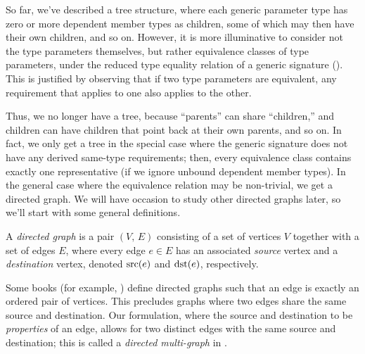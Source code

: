\documentclass[../generics]{subfiles}
\begin{document}
So far, we've described a tree structure, where each generic parameter type has zero or more dependent member types as children, some of which may then have their own children, and so on. However, it is more illuminative to consider not the type parameters themselves, but rather equivalence classes of type parameters, under the reduced type equality relation of a generic signature (). This is justified by observing that if two type parameters are equivalent, any requirement that applies to one also applies to the other.

Thus, we no longer have a tree, because ``parents'' can share ``children,'' and children can have children that point back at their own parents, and so on. In fact, we only get a tree in the special case where the generic signature does not have any derived same-type requirements; then, every equivalence class contains exactly one representative (if we ignore unbound dependent member types). In the general case where the equivalence relation may be non-trivial, we get a directed graph. We will have occasion to study other directed graphs later, so we'll start with some general definitions.

\begin{definition}
A \emph{directed graph} is a pair $(V,\, E)$ consisting of a set of vertices $V$ together with a set of edges $E$, where every edge $e\in E$ has an associated \emph{source} vertex and a \emph{destination} vertex, denoted $\operatorname{src}(e)$ and $\operatorname{dst}(e)$, respectively.

Some books (for example, \cite{grimaldi}) define directed graphs such that an edge is exactly an ordered pair of vertices. This precludes graphs where two edges share the same source and destination. Our formulation, where the source and destination to be \emph{properties} of an edge, allows for two distinct edges with the same source and destination; this is called a \emph{directed multi-graph} in \cite{alggraph}.
\end{definition}
\end{document}
